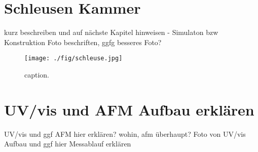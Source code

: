 \section{Schleusen Kammer}
\label{sec:schleuse}

kurz beschreiben und auf nächste Kapitel hinweisen - Simulaton bzw Konstruktion
Foto beschriften, ggfg besseres Foto?
\begin{figure}
    \centering
    \texttt{[image: ./fig/schleuse.jpg]}
    \caption{caption.}
    \label{fig:schleuse}
\end{figure}


\section{UV/vis und AFM Aufbau erklären}
UV/vis und ggf AFM hier erklären? wohin, afm überhaupt?
Foto von UV/vis Aufbau und ggf hier Messablauf erklären
